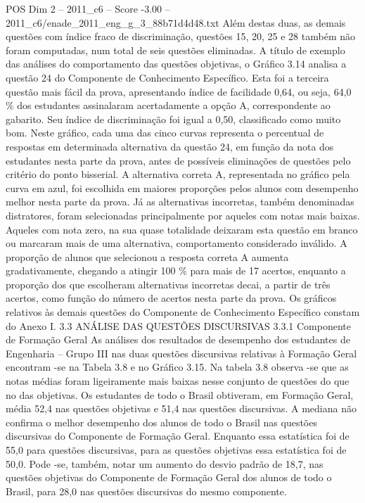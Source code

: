 \begin{textsample}{POS Dim 2 – 2011\_c6 – Score -3.00 – 2011\_c6/enade\_2011\_eng\_g\_3\_88b71d4d48.txt}
Além destas duas, as demais questões com índice fraco de discriminação, questões 15, 20, 25 e 28 também não foram computadas, num total de seis questões eliminadas.
A título de exemplo das análises do comportamento das questões objetivas, o Gráfico 3.14 analisa a questão 24 do Componente de Conhecimento Específico.
Esta foi a terceira questão mais fácil da prova, apresentando índice de facilidade 0,64, ou seja, 64,0 \% dos estudantes assinalaram acertadamente a opção A, correspondente ao gabarito.
Seu índice de discriminação foi igual a 0,50, classificado como muito bom.
Neste gráfico, cada uma das cinco curvas representa o percentual de respostas em determinada alternativa da questão 24, em função da nota dos estudantes nesta parte da prova, antes de possíveis eliminações de questões pelo critério do ponto bisserial.
A alternativa correta A, representada no gráfico pela curva em azul, foi escolhida em maiores proporções pelos alunos com desempenho melhor nesta parte da prova.
Já as alternativas incorretas, também denominadas distratores, foram selecionadas principalmente por aqueles com notas mais baixas.
Aqueles com nota zero, na sua quase totalidade deixaram esta questão em branco ou marcaram mais de uma alternativa, comportamento considerado inválido.
A proporção de alunos que selecionou a resposta correta A aumenta gradativamente, chegando a atingir 100 \% para mais de 17 acertos, enquanto a proporção dos que escolheram alternativas incorretas decai, a partir de três acertos, como função do número de acertos nesta parte da prova.
Os gráficos relativos às demais questões do Componente de Conhecimento Específico constam do Anexo I. 3.3 ANÁLISE DAS QUESTÕES DISCURSIVAS 3.3.1 Componente de Formação Geral As análises dos resultados de desempenho dos estudantes de Engenharia – Grupo III nas duas questões discursivas relativas à Formação Geral encontram -se na Tabela 3.8 e no Gráfico 3.15.
Na tabela 3.8 observa -se que as notas médias foram ligeiramente mais baixas nesse conjunto de questões do que no das objetivas.
Os estudantes de todo o Brasil obtiveram, em Formação Geral, média 52,4 nas questões objetivas e 51,4 nas questões discursivas.
A mediana não confirma o melhor desempenho dos alunos de todo o Brasil nas questões discursivas do Componente de Formação Geral.
Enquanto essa estatística foi de 55,0 para questões discursivas, para as questões objetivas essa estatística foi de 50,0.
Pode -se, também, notar um aumento do desvio padrão de 18,7, nas questões objetivas do Componente de Formação Geral dos alunos de todo o Brasil, para 28,0 nas questões discursivas do mesmo componente.

\end{textsample}

